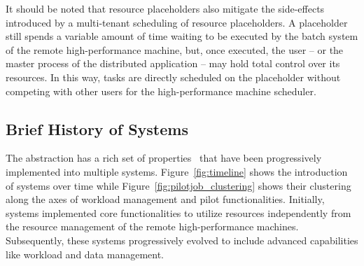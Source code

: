 \documentclass{sig-alternate}
\begin{document}

It should be noted that resource placeholders also mitigate the side-effects
introduced by a multi-tenant scheduling of resource placeholders. A placeholder
still spends a variable amount of time waiting to be executed by the batch
system of the remote high-performance machine, but, once executed, the user --
or the master process of the distributed application -- may hold total control
over its resources. In this way, tasks are directly scheduled on the placeholder
without competing with other users for the high-performance machine scheduler.


\subsection{Brief History of \pilotjob Systems}
\label{sec:histimpl}

The \pilot abstraction has a rich set of properties~\cite{luckow2012towards}
that have been progressively implemented into multiple \pilotjob systems.
Figure~\ref{fig:timeline} shows the introduction of \pilotjob systems over time
while Figure~\ref{fig:pilotjob_clustering} shows their clustering along the axes
of workload management and pilot functionalities. Initially, \pilotjob systems
implemented core functionalities to utilize resources independently from the
resource management of the remote high-performance machines. Subsequently,
these systems progressively evolved to include advanced capabilities like
workload and data management.

\end{document}
